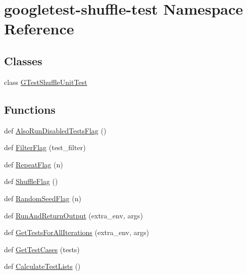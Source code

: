 \hypertarget{namespacegoogletest-shuffle-test}{}\section{googletest-\/shuffle-\/test Namespace Reference}
\label{namespacegoogletest-shuffle-test}
\subsection*{Classes}
\begin{DoxyCompactItemize}
\item 
class \mbox{\hyperlink{classgoogletest-shuffle-test_1_1_g_test_shuffle_unit_test}{G\+Test\+Shuffle\+Unit\+Test}}
\end{DoxyCompactItemize}
\subsection*{Functions}
\begin{DoxyCompactItemize}
\item 
def \mbox{\hyperlink{namespacegoogletest-shuffle-test_a83bb3105809a3bdc00e90954b138ee78}{Also\+Run\+Disabled\+Tests\+Flag}} ()
\item 
def \mbox{\hyperlink{namespacegoogletest-shuffle-test_a0bcd77f6d35c690b596bbddb8ee36765}{Filter\+Flag}} (test\+\_\+filter)
\item 
def \mbox{\hyperlink{namespacegoogletest-shuffle-test_a37b05a14223b814fc403db43f9287ae4}{Repeat\+Flag}} (n)
\item 
def \mbox{\hyperlink{namespacegoogletest-shuffle-test_a8f10ee7774fa361a058274410132c2da}{Shuffle\+Flag}} ()
\item 
def \mbox{\hyperlink{namespacegoogletest-shuffle-test_aa073a0449ab11c6cccb62249e70bb06f}{Random\+Seed\+Flag}} (n)
\item 
def \mbox{\hyperlink{namespacegoogletest-shuffle-test_a90f3ab31f08479d825e13816fbeea842}{Run\+And\+Return\+Output}} (extra\+\_\+env, args)
\item 
def \mbox{\hyperlink{namespacegoogletest-shuffle-test_a4b81c9525e71495e7f512575a3fe436e}{Get\+Tests\+For\+All\+Iterations}} (extra\+\_\+env, args)
\item 
def \mbox{\hyperlink{namespacegoogletest-shuffle-test_a81a570a6aadc23957a949f8740c3708d}{Get\+Test\+Cases}} (tests)
\item 
def \mbox{\hyperlink{namespacegoogletest-shuffle-test_ac6f7bc9bc4f37d2f4b4d0b34fbefca1c}{Calculate\+Test\+Lists}} ()
\end{DoxyCompactItemize}
